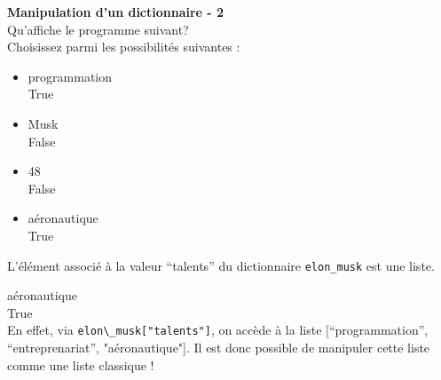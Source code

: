     \begin{Exercice}[5 minutes] [Python] \textbf{Manipulation d'un dictionnaire - 2}\\
      	Qu'affiche le programme suivant? \\
       
      	 
      	
      	Choisissez parmi les possibilités suivantes : \\
      	
      	\begin{itemize}
      	\item[(A)] programmation \\
      	True
      	\item[(B)] Musk \\
      	False
      	\item[(C)] 48 \\
      	False
      	\item[(D)] aéronautique \\
      	True
      	\end{itemize}
    
        \begin{conseil}
            L'élément associé à la valeur ``talents'' du dictionnaire \lstinline{elon_musk} est une liste.
        \end{conseil}
        
        \begin{solution}
            aéronautique \\
            \quad True \\
            
            En effet, via \lstinline{elon\_musk["talents"]}, on accède à la liste [``programmation'', ``entreprenariat'', "aéronautique"]. Il est donc possible de manipuler cette liste comme une liste classique !
        \end{solution}
    \end{Exercice}

